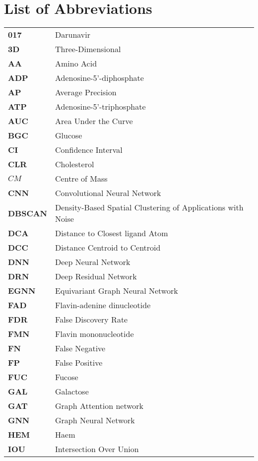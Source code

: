 \chapter*{List of Abbreviations}

\begin{longtable}[l]{@{}p{2.5cm}p{12cm}@{}}
\textbf{017} & Darunavir \\
\textbf{3D} & Three-Dimensional \\
\textbf{AA} & Amino Acid \\
\textbf{ADP} & Adenosine-5'-diphosphate \\
\textbf{AP} & Average Precision \\
\textbf{ATP} & Adenosine-5’-triphosphate \\
\textbf{AUC} & Area Under the Curve \\
\textbf{BGC} & Glucose \\
\textbf{CI} & Confidence Interval \\
\textbf{CLR} & Cholesterol \\
\textbf{$CM$} & Centre of Mass \\
\textbf{CNN} & Convolutional Neural Network \\
\textbf{DBSCAN} & Density-Based Spatial Clustering of Applications with Noise \\
\textbf{DCA} & Distance to Closest ligand Atom \\
\textbf{DCC} & Distance Centroid to Centroid \\
\textbf{DNN} & Deep Neural Network \\
\textbf{DRN} & Deep Residual Network \\
\textbf{EGNN} & Equivariant Graph Neural Network \\
\textbf{FAD} & Flavin-adenine dinucleotide \\
\textbf{FDR} & False Discovery Rate \\
\textbf{FMN} & Flavin mononucleotide \\
\textbf{FN} & False Negative \\
\textbf{FP} & False Positive \\
\textbf{FUC} & Fucose \\
\textbf{GAL} & Galactose \\
\textbf{GAT} & Graph Attention network \\
\textbf{GNN} & Graph Neural Network \\
\textbf{HEM} & Haem \\
\textbf{IOU} & Intersection Over Union \\

\end{longtable}
